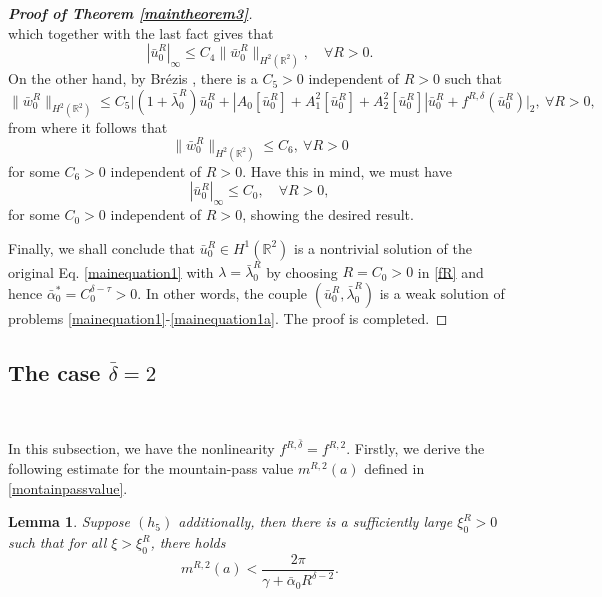 \documentclass[11pt]{amsart}
\numberwithin{equation}{section}
\newtheorem{lemma}[theorem]{Lemma}
\theoremstyle{definition}
\newcommand{\R}{\mathbb{R}}
\begin{document}
\begin{proof}[\emph{\textbf{Proof of Theorem \ref{maintheorem3}}}]
$$$$
which together with the last fact gives that
$$
|\bar{u}_0^R|_\infty \leq C_4\|\bar{w}_0^R\|_{H^{2}(\R^2)}, \quad \forall R>0.
$$
On the other hand, by Br\'{e}zis \cite[Theorem 9.25]{Brezis}, there is a $C_5>0$ independent of $R>0$ such that
$$
\|\bar{w}_0^R\|_{H^{2}(\R^2)} \leq C_5\big|(1+\bar{\lambda}_0^R)  \bar{u}_0^R
+|A_0[\bar{u}_0^R]+A_1^2[\bar{u}_0^R]+A_2^2[\bar{u}_0^R]|\bar{u}_0^R + f^{R,\delta}(\bar{u}_0^R)\big|_2, ~ \forall R>0,
$$
from where it follows that
$$
\|\bar{w}_0^R\|_{H^{2}(\R^2)} \leq C_6, ~ \forall R>0
$$
for some $C_6>0$ independent of $R>0$. Have this in mind, we must have
$$
|\bar{u}_0^R|_\infty \leq C_0, \quad \forall R>0,
$$
for some $C_0>0$ independent of $R>0$, showing the desired result.

Finally, we shall conclude that $\bar{u}_0^R\in H^1(\R^2)$ is a nontrivial solution of the original Eq. \eqref{mainequation1}
with $\lambda=\bar{\lambda}_0^R$
by choosing $R=C_0>0$ in \eqref{fR} and hence $\bar{\alpha}_0^*= C_0^{ \delta-\tau} >0$.
In other words, the couple $(\bar{u}_0^R,\bar{\lambda}_0^R)$ is a weak solution of problems \eqref{mainequation1}-\eqref{mainequation1a}.
 The proof is completed.
\end{proof}

\subsection{The case $\bar{\delta}=2$}\label{cricritical}\

In this subsection, we have the nonlinearity $f^{R,\bar{\delta}}=f^{R,2}$.
Firstly, we derive the following estimate for the mountain-pass value $m^{R,2}(a)$
defined in \eqref{montainpassvalue}.

\begin{lemma}\label{2estimate}
Suppose $(h_5)$ additionally, then there is a sufficiently large $\xi_0^R>0$
such that for all $\xi>\xi_0^R$, there holds
\begin{equation}\label{estimate1}
  m^{R,2}(a)<\frac{2\pi}{ \gamma +\bar{\alpha}_0R^{\delta-2} }.
\end{equation}
\end{lemma}
\end{document}
